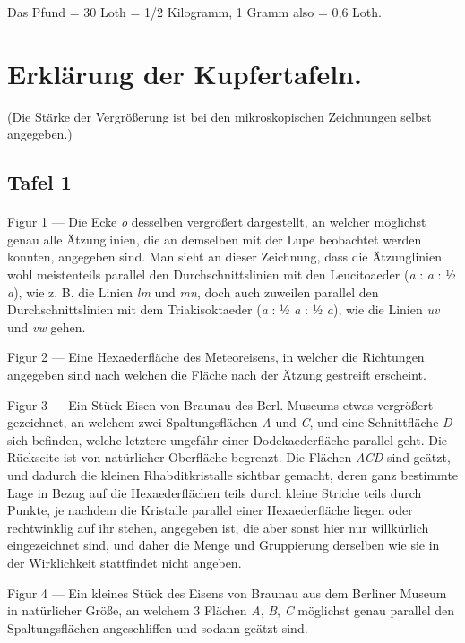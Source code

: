 \documentclass[a4paper, 11pt, oneside]{article}
\begin{document}
\begin{center}
Das Pfund = 30 Loth = 1/2 Kilogramm, 1 Gramm also = 0,6 Loth.
\end{center}
\clearpage
\section{Erklärung der Kupfertafeln.}
\begin{center}
(Die Stärke der Vergrößerung ist bei den mikroskopischen Zeichnungen selbst angegeben.)
\end{center}
\subsection{Tafel 1}
\paragraph{}
Figur 1 --- Die Ecke \emph{o} desselben vergrößert dargestellt, an welcher möglichst genau alle Ätzunglinien, die an demselben mit der Lupe beobachtet werden konnten, angegeben sind. Man sieht an dieser Zeichnung, dass die Ätzunglinien wohl meistenteils parallel den Durchschnittslinien mit den Leucitoaeder (\emph{a} : \emph{a} : ½ \emph{a}), wie z. B. die Linien \emph{lm} und \emph{mn}, doch auch zuweilen parallel den Durchschnittslinien mit dem Triakisoktaeder (\emph{a} : ½ \emph{a} : ½ \emph{a}), wie die Linien \emph{uv} und \emph{vw} gehen.

Figur 2 --- Eine Hexaederfläche des Meteoreisens, in welcher die Richtungen angegeben sind nach welchen die Fläche nach der Ätzung gestreift erscheint.

Figur 3 --- Ein Stück Eisen von Braunau des Berl. Museums etwas vergrößert gezeichnet, an welchem zwei Spaltungsflächen \emph{A} und \emph{C}, und eine Schnittfläche \emph{D} sich befinden, welche letztere ungefähr einer Dodekaederfläche parallel geht. Die Rückseite ist von natürlicher Oberfläche begrenzt. Die Flächen \emph{ACD} sind geätzt, und dadurch die kleinen Rhabditkristalle sichtbar gemacht, deren ganz bestimmte Lage in Bezug auf die Hexaederflächen teils durch kleine Striche teils durch Punkte, je nachdem die Kristalle parallel einer Hexaederfläche liegen oder rechtwinklig auf ihr stehen, angegeben ist, die aber sonst hier nur willkürlich eingezeichnet sind, und daher die Menge und Gruppierung derselben wie sie in der Wirklichkeit stattfindet nicht angeben.

Figur 4 --- Ein kleines Stück des Eisens von Braunau aus dem Berliner Museum in natürlicher Größe, an welchem 3 Flächen \emph{A}, \emph{B}, \emph{C} möglichst genau parallel den Spaltungsflächen angeschliffen und sodann geätzt sind.
\end{document}
